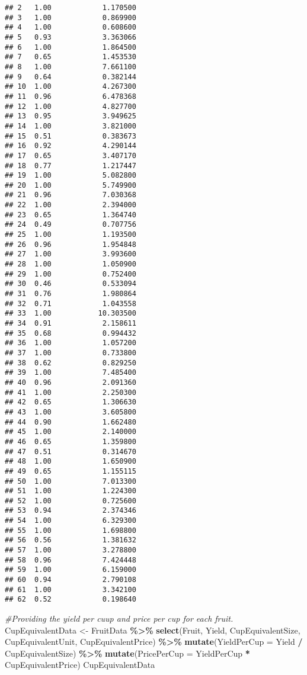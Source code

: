 \documentclass[
]{article}
\newenvironment{Shaded}{\begin{snugshade}}{\end{snugshade}}
\newcommand{\AttributeTok}[1]{\textcolor[rgb]{0.13,0.29,0.53}{#1}}
\newcommand{\CommentTok}[1]{\textcolor[rgb]{0.56,0.35,0.01}{\textit{#1}}}
\newcommand{\FunctionTok}[1]{\textcolor[rgb]{0.13,0.29,0.53}{\textbf{#1}}}
\newcommand{\NormalTok}[1]{#1}
\newcommand{\OtherTok}[1]{\textcolor[rgb]{0.56,0.35,0.01}{#1}}
\newcommand{\SpecialCharTok}[1]{\textcolor[rgb]{0.81,0.36,0.00}{\textbf{#1}}}
\begin{document}
\begin{verbatim}
## 2   1.00            1.170500
## 3   1.00            0.869900
## 4   1.00            0.608600
## 5   0.93            3.363066
## 6   1.00            1.864500
## 7   0.65            1.453530
## 8   1.00            7.661100
## 9   0.64            0.382144
## 10  1.00            4.267300
## 11  0.96            6.478368
## 12  1.00            4.827700
## 13  0.95            3.949625
## 14  1.00            3.821000
## 15  0.51            0.383673
## 16  0.92            4.290144
## 17  0.65            3.407170
## 18  0.77            1.217447
## 19  1.00            5.082800
## 20  1.00            5.749900
## 21  0.96            7.030368
## 22  1.00            2.394000
## 23  0.65            1.364740
## 24  0.49            0.707756
## 25  1.00            1.193500
## 26  0.96            1.954848
## 27  1.00            3.993600
## 28  1.00            1.050900
## 29  1.00            0.752400
## 30  0.46            0.533094
## 31  0.76            1.980864
## 32  0.71            1.043558
## 33  1.00           10.303500
## 34  0.91            2.158611
## 35  0.68            0.994432
## 36  1.00            1.057200
## 37  1.00            0.733800
## 38  0.62            0.829250
## 39  1.00            7.485400
## 40  0.96            2.091360
## 41  1.00            2.250300
## 42  0.65            1.306630
## 43  1.00            3.605800
## 44  0.90            1.662480
## 45  1.00            2.140000
## 46  0.65            1.359800
## 47  0.51            0.314670
## 48  1.00            1.650900
## 49  0.65            1.155115
## 50  1.00            7.013300
## 51  1.00            1.224300
## 52  1.00            0.725600
## 53  0.94            2.374346
## 54  1.00            6.329300
## 55  1.00            1.698800
## 56  0.56            1.381632
## 57  1.00            3.278800
## 58  0.96            7.424448
## 59  1.00            6.159000
## 60  0.94            2.790108
## 61  1.00            3.342100
## 62  0.52            0.198640
\end{verbatim}

\begin{Shaded}
\begin{Highlighting}[]
\CommentTok{\#Providing the yield per cuup and price per cup for each fruit. }
\NormalTok{CupEquivalentData }\OtherTok{\textless{}{-}}\NormalTok{ FruitData }\SpecialCharTok{\%\textgreater{}\%} \FunctionTok{select}\NormalTok{(Fruit, Yield, CupEquivalentSize, CupEquivalentUnit, CupEquivalentPrice) }\SpecialCharTok{\%\textgreater{}\%} \FunctionTok{mutate}\NormalTok{(}\AttributeTok{YieldPerCup =}\NormalTok{ Yield }\SpecialCharTok{/}\NormalTok{ CupEquivalentSize) }\SpecialCharTok{\%\textgreater{}\%} \FunctionTok{mutate}\NormalTok{(}\AttributeTok{PricePerCup =}\NormalTok{ YieldPerCup }\SpecialCharTok{*}\NormalTok{ CupEquivalentPrice)}
\NormalTok{CupEquivalentData}
\end{Highlighting}
\end{Shaded}
\end{document}
